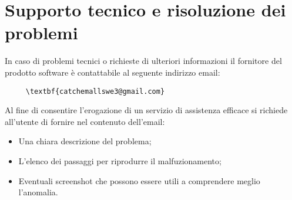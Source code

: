 \section{Supporto tecnico e risoluzione dei problemi}
In caso di problemi tecnici o richieste di ulteriori informazioni il fornitore del prodotto software è contattabile al seguente indirizzo email:
\begin{verbatim}
	 \textbf{catchemallswe3@gmail.com} 
 \end{verbatim}
 Al fine di consentire l'erogazione di un servizio di assistenza efficace si richiede all'utente di fornire nel contenuto dell'email:
\begin{itemize}
	\item Una chiara descrizione del problema;
	\item L'elenco dei passaggi per riprodurre il malfuzionamento;
    \item Eventuali screenshot che possono essere utili a comprendere meglio l'anomalia.
\end{itemize}  
